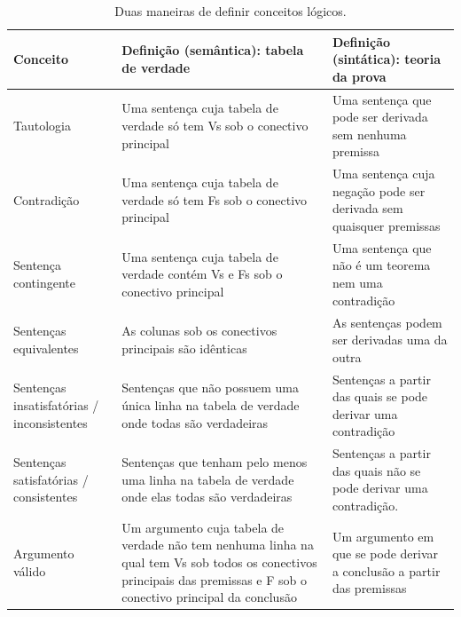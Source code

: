 \begin{table}\small
\setlength{\extrarowheight}{1ex}
\begin{tabular}{>{\centering\arraybackslash}p{}||p{}|p{}}
\hline
\textbf{Conceito} &
\textbf{Definição (semântica): tabela de verdade} &
\textbf{Definição (sintática): teoria da prova} \\
\hline\hline

Tautologia &
Uma sentença cuja tabela de verdade só tem Vs sob o conectivo principal &
Uma sentença que pode ser derivada sem nenhuma premissa \\
\hline

Contradição &
Uma sentença cuja tabela de verdade só tem Fs sob o conectivo principal &
Uma sentença cuja negação pode ser derivada sem quaisquer premissas \\
\hline

Sentença contingente &
Uma sentença cuja tabela de verdade contém Vs e Fs sob o conectivo principal &
Uma sentença que não é um teorema nem uma contradição \\
\hline

Sentenças equivalentes &
As colunas sob os conectivos principais são idênticas &
As sentenças podem ser derivadas uma da outra \\
\hline

Sentenças insatisfatórias / inconsistentes &
Sentenças que não possuem uma única linha na tabela de verdade onde todas são verdadeiras &
Sentenças a partir das quais se pode derivar uma contradição \\
\hline

Sentenças satisfatórias / consistentes &
Sentenças que tenham pelo menos uma linha na tabela de verdade onde elas todas são verdadeiras &
Sentenças a partir das quais não se pode derivar uma contradição. \\
\hline

Argumento válido &
Um argumento cuja tabela de verdade não tem nenhuma linha na qual tem Vs sob todos os conectivos principais das premissas e F sob o conectivo principal da conclusão &
Um argumento em que se pode derivar a conclusão a partir das premissas \\
\hline
\end{tabular}
\caption{Duas maneiras de definir conceitos lógicos.}
\label{table:truth_tables_or_derivations}
\end{table}


